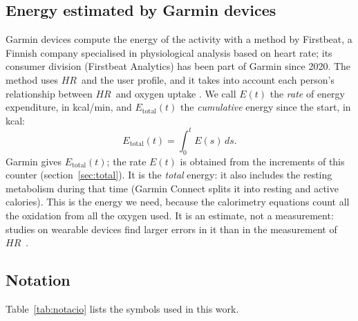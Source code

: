 \documentclass[10pt,a4paper]{article}
\newcommand{\sub}[1]{{\scriptscriptstyle\mathrm{#1}}}   %
\newcommand{\tot}{\sub{total}}
\newcommand{\FC}{\ensuremath{\mathit{HR}}}
\begin{document}
\subsection{Energy estimated by Garmin devices}\label{sec:energia}
Garmin devices compute the energy of the activity with a method by Firstbeat, a Finnish
company specialised in physiological analysis based on heart rate; its consumer division
(Firstbeat Analytics) has been part of Garmin since 2020. The method uses \FC\ and the user
profile, and it takes into account each person's relationship between \FC\ and oxygen
uptake \citep{firstbeat2007}. We call $E(t)$ the \emph{rate} of energy expenditure, in
kcal/min, and $E_{\tot}(t)$ the \emph{cumulative} energy since the start, in kcal:
\begin{equation}
  E_{\tot}(t)=\int_0^t E(s)\,ds .
  \label{eq:etotal}
\end{equation}
Garmin gives $E_{\tot}(t)$; the rate $E(t)$ is obtained from the increments of this counter
(section~\ref{sec:total}). It is the \emph{total} energy: it also includes the resting
metabolism during that time (Garmin Connect splits it into resting and active calories).
This is the energy we need, because the calorimetry equations count all the oxidation from
all the oxygen used. It is an estimate, not a measurement: studies on wearable devices find
larger errors in it than in the measurement of \FC\ \citep{shcherbina2017,fuller2020}.

\needspace{10cm}
\subsection{Notation}
Table~\ref{tab:notacio} lists the symbols used in this work.
\end{document}
